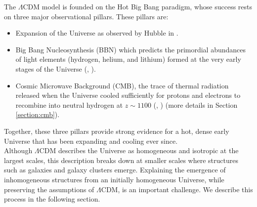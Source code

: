 The $\Lambda$CDM model is founded on the Hot Big Bang paradigm, whose success rests on three major observational pillars. These pillars are:
\begin{itemize}
    \item Expansion of the Universe as observed by Hubble in \cite{Hubble_1929}.
    \item Big Bang Nucleosynthesis (BBN) which predicts the primordial abundances of light elements (hydrogen, helium, and lithium) formed at the very early stages of the Universe (\cite{Cyburt_2016}, \cite{Wagoner_1967}).
    \item Cosmic Microwave Background (CMB), the trace of thermal radiation released when the Universe cooled sufficiently for protons 
    and electrons to recombine into neutral hydrogen at $z \sim 1100$ (\cite{Penzias_1965_a}, \cite{Penzias_1965_b}) (more details in Section \ref{section:cmb}). 
\end{itemize}
Together, these three pillars provide strong evidence for a hot, dense early Universe that has been expanding and cooling ever since. \\


Although $\Lambda$CDM describes the Universe as homogeneous and isotropic at the largest scales, this description breaks down at smaller scales where 
structures such as galaxies and galaxy clusters emerge. Explaining the emergence of inhomogeneous structures from an initially homogeneous Universe, while preserving the 
assumptions of $\Lambda$CDM, is an important challenge. We describe this process in the following section. \\